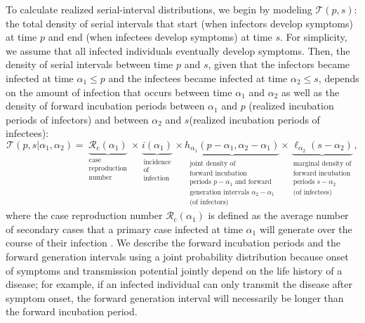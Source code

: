 \documentclass[12pt]{article}
\newcommand{\Rx}[1]{\ensuremath{{\mathcal R}_{#1}}\xspace}
\newcommand{\Rc}{\Rx{\mathrm{c}}}
\newcommand{\psymp}{\ensuremath{p}} %
\newcommand{\ssymp}{\ensuremath{s}} %
\newcommand{\pinf}{\ensuremath{\alpha_1}} %
\newcommand{\sinf}{\ensuremath{\alpha_2}} %
\newcommand{\idist}{\ell} %
\newcommand{\total}{{\mathcal T}} %
\begin{document}
To calculate realized serial-interval distributions, we begin by modeling $\total(\psymp,\ssymp)$: the total density of serial intervals that start (when infectors develop symptoms) at time $\psymp$ and end (when infectees develop symptoms) at time \ssymp.
For simplicity, we assume that all infected individuals eventually develop symptoms.
Then, the density of serial intervals between time $\psymp$ and \ssymp,
given that the infectors became infected at time $\pinf\le\psymp$ and
the infectees became infected at time $\sinf\le\ssymp$, depends on the
amount of infection that occurs between time $\pinf$ and $\sinf$ as well as
the density of forward incubation periods between $\pinf$ and
$\psymp$ (realized incubation periods of infectors) and between
$\sinf$ and \ssymp (realized incubation periods of infectees):
\begin{equation}
\total (\psymp,\ssymp | \alpha_1, \alpha_2)=\underbrace{\Rc (\pinf)}_{\substack{\text{case} \\ \text{reproduction} \\ \text{number}}} 
\times 
\underbrace{i(\pinf)}_{\substack{\text{incidence} \\ \text{of} \\ \text{infection}}} 
\times 
\underbrace{h_{\pinf}(\psymp-\pinf, \sinf - \pinf)}_{\substack{\text{joint density of} \\ \text{forward incubation} \\ \text{periods } p-\pinf \text{ and forward} \\ \text{generation intervals } \sinf-\pinf\\ \text{(of infectors)}}}
\times
\underbrace{\idist_{\sinf}(\ssymp - \sinf)}_{\substack{\text{marginal density of} \\ \text{forward incubation} \\ \text{periods } \ssymp-\sinf \\ \text{(of infectees)}}},
\end{equation}
where the case reproduction number $\Rc (\pinf)$ is defined as the average number of secondary cases that a primary case infected at time $\pinf$ will generate over the course of their infection \citep{fraser2007estimating}.
We describe the forward incubation periods and the forward generation intervals using a joint probability distribution because onset of symptoms and transmission potential jointly depend on the life history of a disease;
for example, if an infected individual can only transmit the disease after symptom onset, the forward generation interval will necessarily be longer than the forward incubation period.
\end{document}

